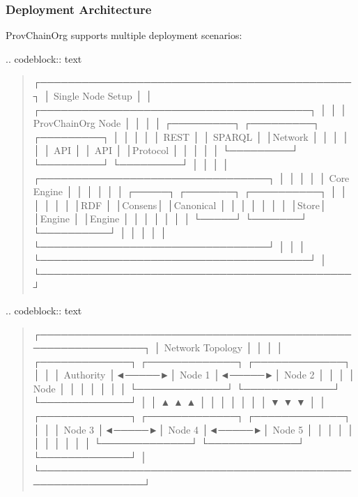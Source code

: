 \documentclass[letterpaper,10pt,english]{sphinxmanual}
\begin{document}
\subsubsection{Deployment Architecture}
\label{\detokenize{research/technical-specifications:deployment-architecture}}
\sphinxAtStartPar
ProvChainOrg supports multiple deployment scenarios:

\sphinxAtStartPar
{}
.. code\sphinxhyphen{}block:: text
\begin{quote}

\sphinxAtStartPar
┌─────────────────────────────────────────────┐
│              Single Node Setup              │
│  ┌───────────────────────────────────────┐  │
│  │           ProvChainOrg Node           │  │
│  │  ┌─────────┐ ┌─────────┐ ┌─────────┐  │  │
│  │  │  REST   │ │ SPARQL  │ │Network  │  │  │
│  │  │  API    │ │  API    │ │Protocol │  │  │
│  │  └─────────┘ └─────────┘ └─────────┘  │  │
│  │  ┌─────────────────────────────────┐  │  │
│  │  │         Core Engine             │  │  │
│  │  │  ┌─────┐ ┌───────┐ ┌──────────┐ │  │  │
│  │  │  │RDF  │ │Consens│ │Canonical │ │  │  │
│  │  │  │Store│ │Engine │ │Engine    │ │  │  │
│  │  │  └─────┘ └───────┘ └──────────┘ │  │  │
│  │  └─────────────────────────────────┘  │  │
│  └───────────────────────────────────────┘  │
└─────────────────────────────────────────────┘
\end{quote}

\sphinxAtStartPar
{}
.. code\sphinxhyphen{}block:: text
\begin{quote}

\sphinxAtStartPar
┌─────────────────────────────────────────────────────────────┐
│                    Network Topology                         │
│                                                             │
│  ┌─────────────┐       ┌─────────────┐       ┌─────────────┐ │
│  │ Authority   │◄─────►│   Node 1    │◄─────►│   Node 2    │ │
│  │   Node      │       │             │       │             │ │
│  └─────────────┘       └─────────────┘       └─────────────┘ │
│        ▲                      ▲                     ▲        │
│        │                      │                     │        │
│        ▼                      ▼                     ▼        │
│  ┌─────────────┐       ┌─────────────┐       ┌─────────────┐ │
│  │   Node 3    │◄─────►│   Node 4    │◄─────►│   Node 5    │ │
│  │             │       │             │       │             │ │
│  └─────────────┘       └─────────────┘       └─────────────┘ │
└─────────────────────────────────────────────────────────────┘
\end{quote}
\end{document}

